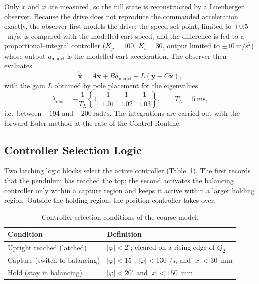 Only $x$ and $\varphi$ are measured, so the full state is reconstructed by a
Luenberger observer. Because the drive does not reproduce the commanded
acceleration exactly, the observer first models the drive: the speed
set-point, limited to $\pm 0.5$~m/s, is compared with the modelled cart speed,
and the difference is fed to a proportional--integral controller ($K_p = 100$,
$K_i = 30$, output limited to $\pm 10~\mathrm{m/s^2}$) whose output
$a_{\mathrm{model}}$ is the modelled cart acceleration. The observer then
evaluates
\begin{equation}
  \dot{\hat{\mathbf{x}}} = A\hat{\mathbf{x}} + B a_{\mathrm{model}}
    + L\left(\mathbf{y} - C\hat{\mathbf{x}}\right),
  \label{eq:observer}
\end{equation}
with the gain $L$ obtained by pole placement for the eigenvalues
\begin{equation}
  \lambda_{\mathrm{obs}} = -\frac{1}{T_L}\left\{1,\ \frac{1}{1.01},\ \frac{1}{1.02},\ \frac{1}{1.03}\right\},
  \qquad T_L = 5~\mathrm{ms},
  \label{eq:obspoles}
\end{equation}
i.e.\ between $-194$ and $-200~\mathrm{rad/s}$. The integrations are carried out with the
forward Euler method at the rate of the Control-Routine.

\subsection{Controller Selection Logic}
\label{subsec:modelogic}

Two latching logic blocks select the active controller
(Table~\ref{tab:modelogic}). The first records that the pendulum has reached
the top; the second activates the balancing controller only within a capture
region and keeps it active within a larger holding region. Outside the holding
region, the position controller takes over.

\begin{table}[ht]
\centering
\caption{Controller selection conditions of the course model.}
\label{tab:modelogic}
\begin{tabular}{p{}p{}}
\toprule
Condition & Definition \\
\midrule
Upright reached (latched) & $|\varphi| < 2^\circ$; cleared on a rising edge of $Q_2$ \\
Capture (switch to balancing) & $|\varphi| < 15^\circ$, $|\dot{\varphi}| < 130^\circ/\mathrm{s}$, and $|x| < 30$~mm \\
Hold (stay in balancing) & $|\varphi| < 20^\circ$ and $|x| < 150$~mm \\
\bottomrule
\end{tabular}
\end{table}

